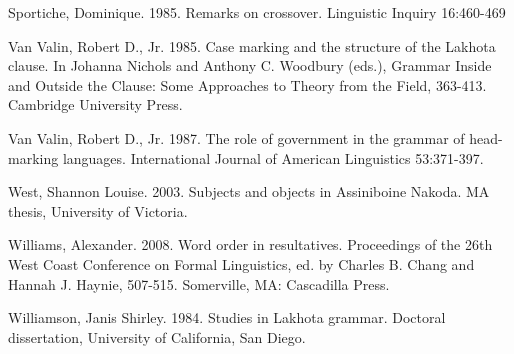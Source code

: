 \documentclass[output=paper]{LSP/langsci}
\begin{document}
\begin{reflist}
Sportiche, Dominique. 1985.  Remarks on crossover.  Linguistic Inquiry 16:460-469

Van Valin, Robert D., Jr. 1985. Case marking and the structure of the Lakhota clause. In Johanna Nichols and Anthony C. Woodbury (eds.), Grammar Inside and Outside the Clause: Some Approaches to Theory from the Field, 363-413. Cambridge 	University Press.

Van Valin, Robert D., Jr. 1987. The role of government in the grammar of head-marking languages. International Journal of American Linguistics 53:371-397.

West, Shannon Louise. 2003. Subjects and objects in Assiniboine Nakoda. MA thesis, University of Victoria.

Williams, Alexander. 2008. Word order in resultatives. Proceedings of the 26th West Coast Conference on Formal Linguistics, ed. by Charles B. Chang and Hannah J. Haynie, 507-515. Somerville, MA: Cascadilla Press.

Williamson, Janis Shirley. 1984. Studies in Lakhota grammar. Doctoral dissertation, University of California, San Diego.

\end{reflist}
\end{document}
